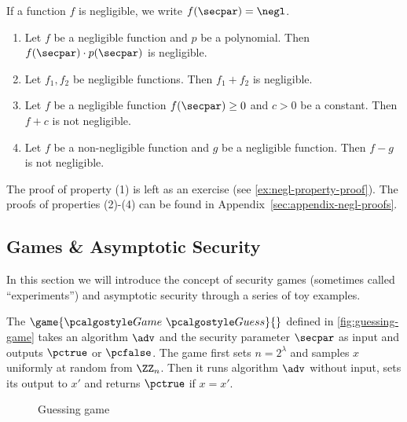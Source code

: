 If a function $f$ is negligible, we write $f(\secpar) = \negl$.


\begin{lemma}
  \label{lem:negl}
  \hfill
  \begin{enumerate}
  \item Let $f$ be a negligible function and $p$ be a polynomial. Then $f(\secpar) \cdot p(\secpar)$ is negligible.
  \item Let $f_1, f_2$ be negligible functions. Then $f_1 + f_2$ is negligible.
  \item Let $f$ be a negligible function $f(\secpar) \ge 0$ and $c > 0$ be a constant. Then $f + c$ is not negligible.
  \item Let $f$ be a non-negligible function and $g$ be a negligible function. Then $f - g$ is not negligible.
  \end{enumerate}
\end{lemma}

The proof of property (1) is left as an exercise (see \autoref{ex:negl-property-proof}).
The proofs of properties (2)-(4) can be found in Appendix~\ref{sec:appendix-negl-proofs}.

\subsection{Games \& Asymptotic Security}

In this section we will introduce the concept of security games (sometimes called ``experiments'') and asymptotic security through a series of toy examples.

The $\game{\Game~\algo{Guess}}{}$ defined in \autoref{fig:guessing-game} takes an algorithm $\adv$ and the security parameter $\secpar$ as input and outputs $\pctrue$ or $\pcfalse$.
The game first sets $n = 2^\lambda$ and samples $x$ uniformly at random from $\ZZ_n$.
Then it runs algorithm $\adv$ without input, sets its output to $x'$ and returns $\pctrue$ if $x = x'$.

\begin{figure}[tbhp]
  \begin{center}
    \begin{tcolorbox}[width=3cm]
      \begin{pchstack}[center]
      \end{pchstack}
    \end{tcolorbox}
  \end{center}
  \caption{Guessing game\label{fig:guessing-game}}
\end{figure}

